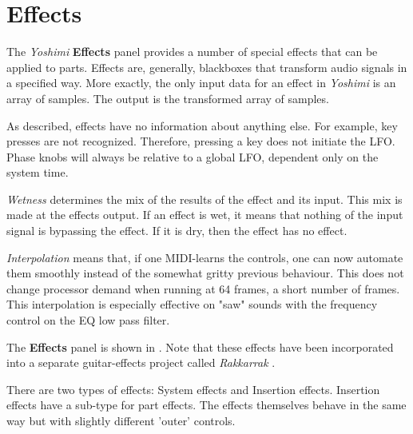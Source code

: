 %
%
%

\section{Effects}
\label{sec:effects}

   The \textsl{Yoshimi} \textbf{Effects} panel provides a number of special
   effects that can be applied to parts.
   Effects are, generally, blackboxes that transform audio signals in a
   specified way. More exactly, the only input data for an effect in
   \textsl{Yoshimi} is an array of samples.
   The output is the transformed array of samples.

   As described, effects have no information about anything else. For
   example, key presses are not recognized. Therefore, pressing a key does
   not initiate the LFO. Phase knobs will always be relative to a global LFO,
   dependent only on the system time.

   \textsl{Wetness} determines the mix of the results of the effect and its
   input.  This mix is made at the effects output. If an effect is wet, it
   means that nothing of the input signal is bypassing the effect. If it is
   dry, then the effect has no effect.

   \textsl{Interpolation}
   means that, if one MIDI-learns the controls, one can now automate them
   smoothly instead of the somewhat gritty previous behaviour.
   This does not change processor demand when running at 64 frames, a short
   number of frames.
   This interpolation is especially effective on "saw" sounds with the
   frequency control on the EQ low pass filter.


   The \textbf{Effects} panel is shown in
   .
   Note that these effects have been incorporated into a separate
   guitar-effects project called \textsl{Rakkarrak} \cite{rakarrack}.

   There are two types of effects: System effects and Insertion effects.
   Insertion effects have a sub-type for part effects. The effects themselves
   behave in the same way but with slightly different 'outer' controls.

